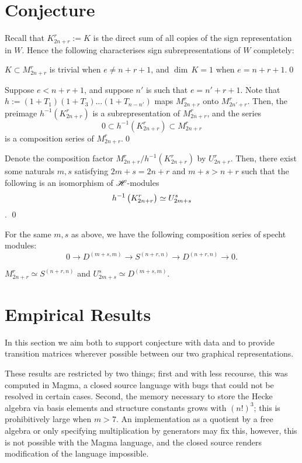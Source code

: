\documentclass{amsart}
\begin{document}
\section{Conjecture}\label{Conjecture Section}
Recall that $K_{2n + r}^r := K$ is the direct sum of all copies of the sign representation in $W$.
Hence the following characterises sign subrepresentations of $W$ completely:
\begin{proposition}
  $K \subset M_{2n + r}^r$ is trivial when $e \neq n + r + 1$, and $\dim \, K = 1$ when $e = n + r + 1$.\qed
\end{proposition} 
\begin{proposition}
  Suppose $e < n + r + 1$, and suppose $n'$ is such that $e = n' + r + 1$.
  Note that $h := (1 + T_1)(1 + T_3)\dots(1 + T_{n - n'})$ maps $M_{2n + r}^r$ onto $M_{2n' + r}^r$.
  Then, the preimage $h^{-1}(K_{2n + r}^r)$ is a subrepresentation of $M_{2n + r}^r$, and the series
  \[
    0 \subset h^{-1}(K_{2n + r}^r) \subset M_{2n + r}^r
  \]
  is a composition series of $M_{2n + r}^r$.\qed
\end{proposition}
\begin{proposition}
  Denote the composition factor $M_{2n + r}^r / h^{-1}(K_{2n + r}^r)$ by $U_{2n + r}^r$.
  Then, there exist some naturals $m,s$ satisfying $2m + s = 2n + r$ and $m + s > n + r$ such that the following is an isomorphism of $\mathscr{H}$-modules \[h^{-1}\left( K_{2n + r}^r \right) \simeq U_{2m + s}^s\].
  \qed
\end{proposition}
\begin{proposition}
  For the same $m,s$ as above, we have the following composition series of specht modules:
  \[
    0 \longrightarrow D^{(m+s,m)} \longrightarrow S^{(n+r,n)} \longrightarrow D^{(n+r,n)} \longrightarrow 0.
  \]
\end{proposition}
\begin{proposition}
  $M_{2n + r}^r \simeq S^{(n+r,n)}$ and $U_{2m +s}^s \simeq D^{(m+s,m)}$.
\end{proposition}

\section{Empirical Results}\label{Empirics Section}
In this section we aim both to support conjecture with data and to provide transition matrices wherever possible between our two graphical representations.\cite{Github}

\begin{remark}
  These results are restricted by two things; first and with less recourse, this was computed in Magma, a closed source language with bugs that could not be resolved in certain cases.
  Second, the memory necessary to store the Hecke algebra via basis elements and structure constants grows with $(n!)^3$;
  this is prohibitively large when $m > 7$.
  An implementation as a quotient by a free algebra or only specifying multiplication by generators may fix this, however, this is not possible with the Magma language, and the closed source renders modification of the language impossible.
\end{remark}
\end{document}
